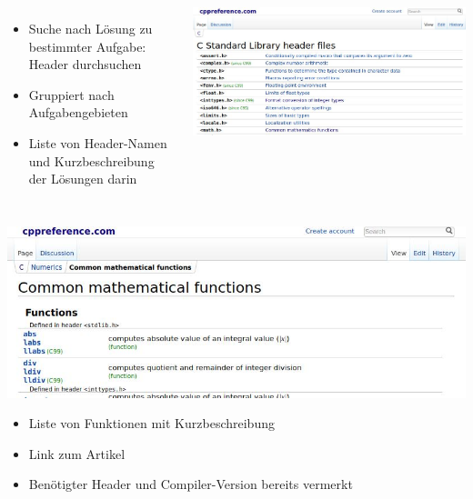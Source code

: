 \begin{frame}
%
\begin{columns}%
\begin{itemize}
\item Suche nach Lösung zu bestimmter Aufgabe: Header durchsuchen
\item Gruppiert nach Aufgabengebieten
\item Liste von Header-Namen und Kurzbeschreibung der Lösungen darin
\end{itemize}
%
\includegraphics[width=\linewidth]{./gfx/cpp-headers}
\end{columns}
%
\end{frame}


\begin{frame}
%
\includegraphics[width=\linewidth]{./gfx/cpp-math}
%
\begin{itemize}
\item Liste von Funktionen mit Kurzbeschreibung
\item Link zum Artikel
\item Benötigter Header und Compiler-Version bereits vermerkt
\end{itemize}
%
\end{frame}




